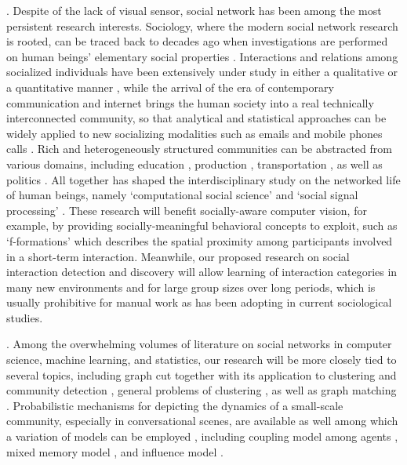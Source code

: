 .  Despite of the lack of visual sensor, social network has been among the most persistent research interests. Sociology, where the modern social network research is rooted, can be traced back to decades ago when investigations are performed on human beings' elementary social properties \cite{Darwin,Thomkins,Goffman,Kendon1990,Ekman,Hoyle,Tannen}. Interactions and relations among socialized individuals have been extensively under study in either a qualitative or a quantitative manner \cite{Goodwin2000,Goldin,Goodwin2007,Kendon2010}, while the arrival of the era of contemporary communication and internet brings the human society into a real technically interconnected community, so that analytical and statistical approaches can be widely applied to new socializing modalities such as emails \cite{Eckmann} and mobile phones calls \cite{Onnela,Eagle}. Rich and heterogeneously structured communities can be abstracted from various domains, including education \cite{Scherr2009}, production \cite{Watts}, transportation \cite{Gonzalez},  as well as politics \cite{Iacus}. All together has shaped the interdisciplinary study on the networked life of human beings, namely `computational social science' \cite{Lazer2009} and `social signal processing' \cite{Pantic}. These research will benefit socially-aware computer vision, for example, by providing socially-meaningful behavioral concepts to exploit, such as `f-formations' \cite{Kendon1990} which describes the spatial proximity among participants involved in a short-term interaction. Meanwhile, our proposed research on social interaction detection and discovery will allow learning of interaction categories in many new environments and for large group sizes over long periods, which is usually prohibitive for manual work as has been adopting in current sociological studies.



. Among the overwhelming volumes of literature on social networks in computer science, machine learning, and statistics, our research will be more closely tied to several topics, including graph cut \cite{Boykov:segmentation} together with its application to clustering and community detection \cite{Ng:spectral,Filippone:clustering}, general problems of clustering \cite{Xu:clustering}, as well as graph matching \cite{West:Graph,Caetano:graph}. Probabilistic mechanisms for depicting the dynamics of a small-scale community, especially in conversational scenes, are available as well \cite{Basu:meeting,Dong} among which a variation of models can be employed , including coupling model among agents \cite{Brand:CHMM}, mixed memory model \cite{Choudhury:MHMM}, and influence model \cite{Pan:influence}.

